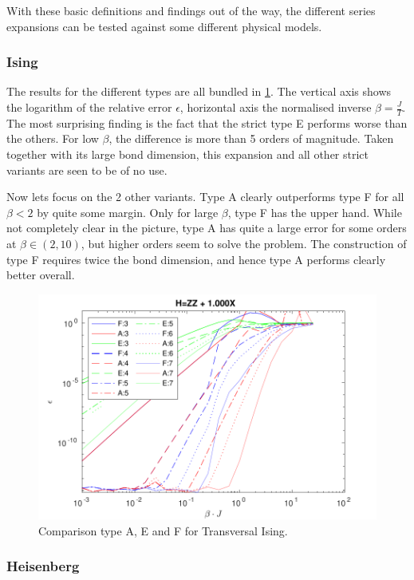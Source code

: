 With these basic definitions and findings out of the way, the different series expansions can be tested against some different physical models.

\subsubsection{Ising}

The results for the different types are all bundled in \cref{fig:benchmark:tising}. The vertical axis shows the logarithm of the relative error $\epsilon$, horizontal axis the normalised inverse $\beta= \frac{J}{T}$. The most surprising finding is the fact that the strict type E performs worse than the others. For low $\beta$, the difference is more than 5 orders of magnitude. Taken together with its large bond dimension, this expansion  and all other strict variants are seen to be of no use.

Now lets focus on the 2 other variants. Type A clearly outperforms type F for all $\beta<2$ by quite some margin. Only for large $\beta$, type F has the upper hand. While not completely clear in the picture, type A has quite a large error for some orders at $\beta \in (2,10) $, but higher orders seem to solve the problem. The construction of type F requires twice the bond dimension, and hence type A performs clearly better overall.

\begin{figure}[H]
    \center
    \includegraphics[width=\textwidth]{Figuren/benchmarking/t_ising.pdf}
    \caption{Comparison type A, E and F for Transversal Ising. }
    \label{fig:benchmark:tising}
\end{figure}

\subsubsection{Heisenberg}

